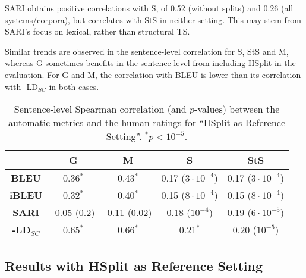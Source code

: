 \documentclass[11pt,a4paper]{article}
\begin{document}
SARI obtains positive correlations with S, of 0.52 (without splits) and 0.26 (all systems/corpora),
but correlates with StS in neither setting.
This may stem from SARI's focus on 
lexical, rather than structural TS. %

Similar trends are observed in the sentence-level correlation for S, StS and M, whereas G sometimes benefits in the sentence level from including HSplit in the evaluation. For G and M, the correlation with BLEU is lower than its correlation with -LD$_{SC}$ in both cases.


\begin{center}
\begin{table}[h]
\scriptsize
\centering
\setlength\tabcolsep{4pt}
\begin{tabular}{|c|c|c|c|c|}
\hline
&{\bf G} & {\bf M} & {\bf S} & {\bf StS} \\
\hline
{\bf BLEU}& 0.36$^*$& 0.43$^*$ & 0.17 ($3 \cdot 10^{-4}$) &0.17  ($3 \cdot 10^{-4}$)   \\
\hline   
{\bf iBLEU} & 0.32$^*$ &0.40$^*$ & 0.15 ($8 \cdot 10^{-4}$) & 0.15 ($8 \cdot 10^{-4}$) \\
\hline
{\bf SARI} & -0.05 (0.2)& -0.11 (0.02)  &  0.18 ($10^{-4}$) & 0.19 ($6 \cdot 10^{-5}$)\\
\hline \hline
{\bf -LD$_{SC}$} & 0.65$^*$ & 0.66$^*$ &0.21$^*$ & 0.20 ($10^{-5}$) \\
\hline   
\end{tabular}
\hfill
\caption{\small Sentence-level Spearman correlation (and $p$-values) between the automatic metrics and the human ratings for ``HSplit as Reference Setting''. $^*p<10^{-5}$.}  
\label{tab:correlation_splitreferences}
\end{table}
\end{center}
\vspace{-1cm}

\subsection{Results with HSplit as Reference Setting}\label{sec:splitting_refs}

\end{document}
